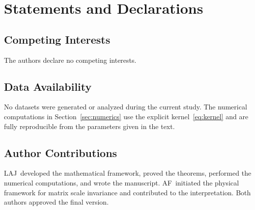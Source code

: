 \documentclass[12pt]{article}
\begin{document}
\section*{Statements and Declarations}

\subsection*{Competing Interests}
The authors declare no competing interests.

\subsection*{Data Availability}
No datasets were generated or analyzed during the current study.
The numerical computations in Section~\ref{sec:numerics} use the
explicit kernel~\eqref{eq:kernel} and are fully reproducible from
the parameters given in the text.

\subsection*{Author Contributions}
LAJ\ developed the mathematical framework, proved the theorems,
performed the numerical computations, and wrote the manuscript.
AF\ initiated the physical framework for matrix scale invariance
and contributed to the interpretation.
Both authors approved the final version.



\end{document}
